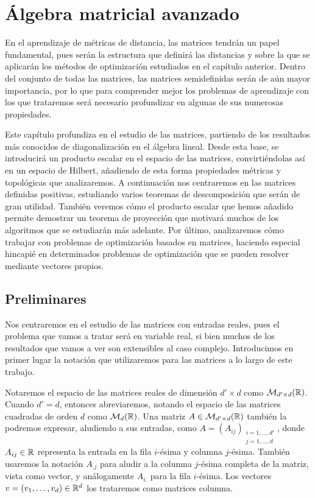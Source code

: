 \chapter{Álgebra matricial avanzado}

En el aprendizaje de métricas de distancia, las matrices tendrán un papel fundamental, pues serán la estructura que definirá las distancias y sobre la que se aplicarán los métodos de optimización estudiados en el capítulo anterior. Dentro del conjunto de todas las matrices, las matrices semidefinidas serán de aún mayor importancia, por lo que para comprender mejor los problemas de aprendizaje con los que trataremos será necesario profundizar en algunas de sus numerosas propiedades.

Este capítulo profundiza en el estudio de las matrices, partiendo de los resultados más conocidos de diagonalización en el álgebra lineal. Desde esta base, se introducirá un producto escalar en el espacio de las matrices, convirtiéndolas así en un espacio de Hilbert, añadiendo de esta forma propiedades métricas y topológicas que analizaremos. A continuación nos centraremos en las matrices definidas positivas, estudiando varios teoremas de descomposición que serán de gran utilidad. También veremos cómo el producto escalar que hemos añadido permite demostrar un teorema de proyección que motivará muchos de los algoritmos que se estudiarán más adelante. Por último, analizaremos cómo trabajar con problemas de optimización basados en matrices, haciendo especial hincapié en determinados problemas de optimización que se pueden resolver mediante vectores propios.

\section{Preliminares}

Nos centraremos en el estudio de las matrices con entradas reales, pues el problema que vamos a tratar será en variable real, si bien muchos de los resultados que vamos a ver son extensibles al caso complejo. Introducimos en primer lugar la notación que utilizaremos para las matrices a lo largo de este trabajo.

Notaremos el espacio de las matrices reales de dimensión $d' \times d$ como $\mathcal{M}_{d'\times d}(\mathbb{R})$. Cuando $d' = d$, entonces abreviaremos, notando el espacio de las matrices cuadradas de orden $d$ como $\mathcal{M}_d(\mathbb{R})$. Una matriz $A \in \mathcal{M}_{d'\times d}(\mathbb{R})$ también la podremos expresar, aludiendo a sus entradas, como $A = (A_{ij})_{\substack{i=1,\dots,d' \\ j=1,\dots,d}}$, donde $A_{ij} \in \mathbb{R}$ representa la entrada en la fila $i$-ésima y columna $j$-ésima. También usaremos la notación $A_{.j}$ para aludir a la columna $j$-ésima completa de la matriz, vista como vector, y análogamente $A_{i.}$ para la fila $i$-ésima. Los vectores $v = (v_1,\dots,v_d) \in \mathbb{R}^d$ los trataremos como matrices columna.

